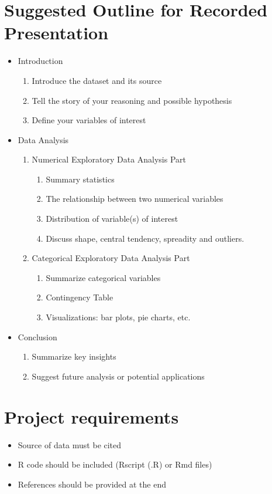 \documentclass[12pt]{article}
\begin{document}
\section*{Suggested Outline for Recorded Presentation}
\begin{itemize}
    \item Introduction
    \begin{enumerate}
        \item Introduce the dataset and its source
        \item Tell the story of your reasoning and possible hypothesis
        \item Define your variables of interest
    \end{enumerate}
    \item Data Analysis
    \begin{enumerate}
        \item Numerical Exploratory Data Analysis Part
        \begin{enumerate}
            \item Summary statistics 
            \item The relationship between two numerical variables 
            \item Distribution of variable(s) of interest
            \item Discuss shape, central tendency, spreadity and outliers. 
        \end{enumerate}
        \item Categorical Exploratory Data Analysis Part
        \begin{enumerate}
            \item Summarize categorical variables
            \item Contingency Table 
            \item Visualizations: bar plots, pie charts, etc.
        \end{enumerate} 
    \end{enumerate}
    \item Conclusion
        \begin{enumerate}
            \item Summarize key insights
            \item Suggest future analysis or potential applications
        \end{enumerate} 
\end{itemize}

\section*{Project requirements}
\begin{itemize}
    \item Source of data must be cited
    \item R code should be included (Rscript (.R) or Rmd files)
    \item References should be provided at the end
\end{itemize}
\end{document}
